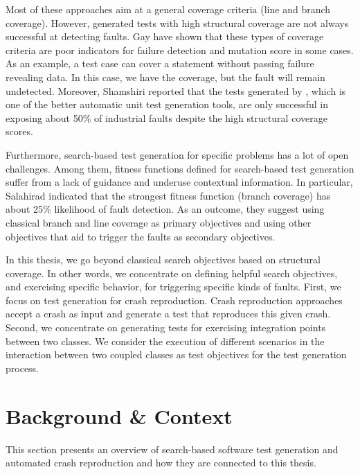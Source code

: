 Most of these approaches aim at a general coverage criteria (\eg line and branch coverage). However,  generated tests with high structural coverage are not always successful at detecting faults. Gay \etal \cite{gay2015risks} have shown that these types of coverage criteria are poor indicators for failure detection and mutation score in some cases. As an example, a test case can cover a statement without passing failure revealing data. In this case, we have the coverage, but the fault will remain undetected.
Moreover, Shamshiri \etal \cite{Shamshiri2016} reported that the tests generated by \evosuite, which is one of the better automatic unit test generation tools, are only successful in exposing about 50\% of industrial faults despite the high structural coverage scores. 

Furthermore, search-based test generation for specific problems has a lot of open challenges. Among them, fitness functions defined for search-based test generation suffer from a lack of guidance and underuse contextual information.  
In particular, Salahirad \etal \cite{Salahirad2019} indicated that the strongest fitness function (branch coverage) has about 25\% likelihood of fault detection.
As an outcome, they suggest using classical branch and line coverage as primary objectives and using other objectives that aid to trigger the faults as secondary objectives.

In this thesis, we go beyond classical search objectives based on structural coverage. In other words, we concentrate on defining helpful search objectives, and exercising specific behavior, for triggering specific kinds of faults. First, we focus on test generation for crash reproduction. Crash reproduction approaches \cite{Soltani2018a, BPT17concrash, Chen2015, Nayrolles2017, Rossler2013, Xuan2015} accept a crash as input and generate a test that reproduces this given crash. Second, we concentrate on generating tests for exercising integration points between two classes. We consider the execution of different scenarios in the interaction between two coupled classes as test objectives for the test generation process.

\section{Background \& Context}

This section presents an overview of search-based software test generation and automated crash reproduction and how they are connected to this thesis.

